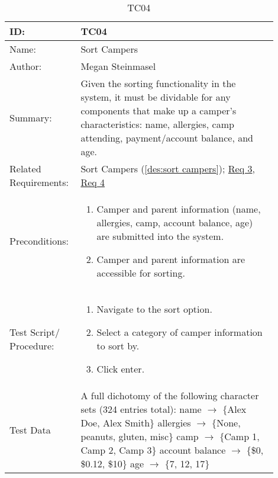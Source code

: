 \documentclass[11pt]{article}
\begin{document}
\begin{table}[H]
\begin{center}
\caption{TC04}
\label{TC04}
\begin{tabular}{p{0.20\linewidth}p{0.70\linewidth}}
	ID: & TC04\\\hline
	Name: & Sort Campers \\\hline
	Author: & Megan Steinmasel\\\hline
	Summary: & Given the sorting functionality in the system, it must be dividable for any components that make up a camper's characteristics: name, allergies, camp attending, payment/account balance, and age. \\\hline
	Related \hspace{5em} Requirements:& Sort Campers (\cref{des:sort campers}); \hyperlink{Req3}{Req 3}, \hyperlink{Req4}{Req 4}\\\hline
	Preconditions:& \begin{enumerate}[topsep=0pt] 
		\item Camper and parent information (name, allergies, camp, account balance, age) are submitted into the system.
		\item Camper and parent information are accessible for sorting.
	\end{enumerate}\\\hline
	Test Script/ Procedure: & \begin{enumerate}[topsep=0pt]
	\item Navigate to the sort option.
	\item Select a category of camper information to sort by.
	\item Click enter.
	\end{enumerate}\\\hline
	Test Data & \vspace*{.25em} A full dichotomy of the following character sets (324 entries total): \newline
	\hspace*{1cm} name $\rightarrow$ $\{$Alex Doe, Alex Smith$\}$	\newline
	\hspace*{1cm} allergies $\rightarrow$ $\{$None, peanuts, gluten, misc$\}$	\newline
	\hspace*{1cm} camp $\rightarrow$ $\{$Camp 1, Camp 2, Camp 3$\}$\newline
	\hspace*{1cm} account balance $\rightarrow$ $\{$\$0, \$0.12, \$10$\}$\newline
	\hspace*{1cm} age $\rightarrow$ $\{$7, 12, 17$\}$
\end{tabular}
\end{center}
\end{table}
\end{document}
